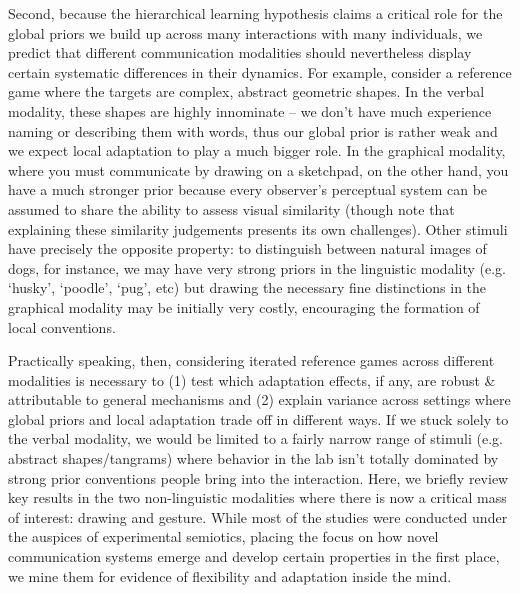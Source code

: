 \documentclass[11pt, floatsintext, jou]{apa6}
\begin{document}
Second, because the hierarchical learning hypothesis claims a critical role for the global priors we build up across many interactions with many individuals, we predict that different communication modalities should nevertheless display certain systematic differences in their dynamics. For example, consider a reference game where the targets are complex, abstract geometric shapes. In the verbal modality, these shapes are highly innominate -- we don't have much experience naming or describing them with words, thus our global prior is rather weak and we expect local adaptation to play a much bigger role. In the graphical modality, where you must communicate by drawing on a sketchpad, on the other hand, you have a much stronger prior because every observer's perceptual system can be assumed to share the ability to assess visual similarity (though note that explaining these similarity judgements presents its own challenges). Other stimuli have precisely the opposite property: to distinguish between natural images of dogs, for instance, we may have very strong priors in the linguistic modality (e.g. `husky', `poodle', `pug', etc) but drawing the necessary fine distinctions in the graphical modality may be initially very costly, encouraging the formation of local conventions. 

Practically speaking, then, considering iterated reference games across different modalities is necessary to (1) test which adaptation effects, if any, are robust \& attributable to general mechanisms and (2) explain variance across settings where global priors and local adaptation trade off in different ways. If we stuck solely to the verbal modality, we would be limited to a fairly narrow range of stimuli (e.g. abstract shapes/tangrams) where behavior in the lab isn't totally dominated by strong prior conventions people bring into the interaction. Here, we briefly review key results in the two non-linguistic modalities where there is now a critical mass of interest: drawing and gesture. While most of the studies were conducted under the auspices of experimental semiotics, placing the focus on how novel communication systems emerge and develop certain properties in the first place, we mine them for evidence of flexibility and adaptation inside the mind. 
\end{document}
